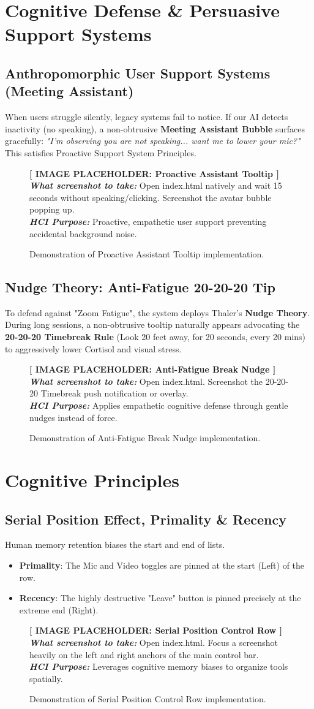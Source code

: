 \documentclass[12pt,a4paper]{article}
\newcommand{\imageplaceholder}[3]{
    \begin{figure}[H]
        \centering
        \begin{tcolorbox}[colback=placeholderbg,colframe=placeholderborder,arc=4mm,height=7.5cm,valign=center,halign=center]
            {\Large\textbf{\textcolor{hciblue}{[ IMAGE PLACEHOLDER: #1 ]}}}\\[0.5cm]
            \textit{\textbf{What screenshot to take:}} #2\\[0.3cm]
            \textit{\textbf{HCI Purpose:}} #3
        \end{tcolorbox}
        \caption{Demonstration of #1 implementation.}
    \end{figure}
}
\begin{document}
\section{Cognitive Defense \& Persuasive Support Systems}

\subsection{Anthropomorphic User Support Systems (Meeting Assistant)}
When users struggle silently, legacy systems fail to notice. If our AI detects inactivity (no speaking), a non-obtrusive \textbf{Meeting Assistant Bubble} surfaces gracefully: \textit{"I'm observing you are not speaking... want me to lower your mic?"} This satisfies Proactive Support System Principles.
\imageplaceholder{Proactive Assistant Tooltip}{Open index.html natively and wait 15 seconds without speaking/clicking. Screenshot the avatar bubble popping up.}{Proactive, empathetic user support preventing accidental background noise.}

\subsection{Nudge Theory: Anti-Fatigue 20-20-20 Tip}
To defend against "Zoom Fatigue", the system deploys Thaler's \textbf{Nudge Theory}. During long sessions, a non-obtrusive tooltip naturally appears advocating the \textbf{20-20-20 Timebreak Rule} (Look 20 feet away, for 20 seconds, every 20 mins) to aggressively lower Cortisol and visual stress.
\imageplaceholder{Anti-Fatigue Break Nudge}{Open index.html. Screenshot the 20-20-20 Timebreak push notification or overlay.}{Applies empathetic cognitive defense through gentle nudges instead of force.}

\section{Cognitive Principles}

\subsection{Serial Position Effect, Primality \& Recency}
Human memory retention biases the start and end of lists. 
\begin{itemize}
    \item \textbf{Primality}: The Mic and Video toggles are pinned at the start (Left) of the row.
    \item \textbf{Recency}: The highly destructive "Leave" button is pinned precisely at the extreme end (Right).
\end{itemize}
\imageplaceholder{Serial Position Control Row}{Open index.html. Focus a screenshot heavily on the left and right anchors of the main control bar.}{Leverages cognitive memory biases to organize tools spatially.}
\end{document}

